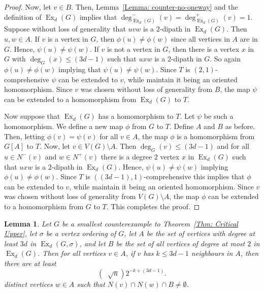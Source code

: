 \documentclass[11pt]{article}
\newtheorem{lemma}[theorem]{Lemma}
\theoremstyle{definition}
\DeclareMathOperator{\ex}{\text{Ex}}
\DeclareMathOperator{\coe}{6\Big(1+\frac{9d^2}{4}\Big)^{\frac{1}{2}}d}
\begin{document}
\begin{proof}
    Now, let $v \in B$. Then, Lemma~\ref{Lemma: counter-no-oneway} and the definition of $\ex_d(G)$
    implies that $\deg_{\ex_d(G)}^-(v)=\deg_{\ex_d(G)}^+(v)=1$.
    Suppose without loss of generality that $uvw$ is a $2$-dipath in $\ex_d(G)$.
    Then $u,w\in A$.
    If $v$ is a vertex in $G$, then $\phi(u)\neq \phi(w)$ since all vertices in $A$ are in $G$.
    Hence, $\psi(u)\neq \psi(w)$.
    If $v$ is not a vertex in $G$, then there is a vertex $x$ in $G$ with $\deg_G(x) \leq (3d-1)$
    such that $uxw$ is a $2$-dipath in $G$. So again $\phi(u)\neq \phi(w)$ implying that $\psi(u)\neq \psi(w)$.
    Since $T$ is $(2,1)$-comprehensive $\psi$ can be extended to $v$, while maintain it being an oriented homomorphism.
    Since $v$ was chosen without loss of generality from $B$, the
    map $\psi$ can be extended to a homomorphism from $\ex_d(G)$ to $T$.

    Now suppose that $\ex_d(G)$ has a homomorphism to $T$.
    Let $\psi$ be such a homomorphism.
    We define a new map $\phi$ from $G$ to $T$.
    Define $A$ and $B$ as before.
    Then, letting $\phi(v)= \psi(v)$ for all $v \in A$, the map
    $\phi$ is a homomorphism from $G[A]$ to $T$.
    Now, let $v \in V(G)\setminus A$.
    Then $\deg_G(v)\leq (3d-1)$
    and for all $u \in N^-(v)$ and $w \in N^+(v)$
    there is a degree $2$ vertex $x$ in $\ex_d(G)$ such
    that $uxw$ is a $2$-dipath in $\ex_d(G)$.
    Hence, $\psi(u)\neq \psi(w)$ implying $\phi(u)\neq \phi(w)$.
    Since $T$ is $((3d-1),1)$-comprehensive this implies that
    $\phi$ can be extended to $v$, while maintain it being an oriented homomorphism.
    Since $v$ was chosen without loss of generality from $V(G)\setminus A$, the
    map $\phi$ can be extended to a homomorphism from $G$ to $T$.
    This completes the proof.
\end{proof}



\begin{lemma}\label{Lemma: The Fun Bit}
    Let $G$ be a smallest counterexample to Theorem~\ref{Thm: Critical Upper}, let $\sigma$ be a vertex ordering of $G$,
    let $A$ be the set of vertices with degree at least $3d$ in $\ex_d(G,\sigma)$, and let $B$ be the set of all vertices of degree at most $2$ in $\ex_d(G)$.
    Then 
    for all vertices $v \in A$, if $v$ has $k\leq 3d-1$ neighbours in $A$, 
    then 
    there are at least
    \[
    (\coe\sqrt{n})2^{-k+(3d-1)}.
    \]
    distinct vertices $w\in A$ such that $N(v)\cap N(w)\cap B \neq \emptyset$.
\end{lemma}
\end{document}
